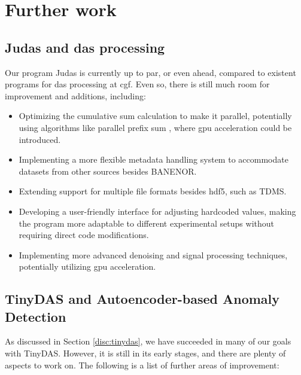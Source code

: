 \section{Further work}
\label{conc:further}

\subsection{Judas and \acrshort{das} processing}

Our program Judas is currently up to par, or even ahead, compared to existent programs for \acrshort{das} processing at \acrshort{cgf}. Even so, there is still much room for improvement and additions, including:

\begin{itemize}
    \item Optimizing the cumulative sum calculation to make it parallel, potentially using algorithms like parallel prefix sum \cite{harris2007parallel}, where \acrshort{gpu} acceleration could be introduced.
    \item Implementing a more flexible metadata handling system to accommodate datasets from other sources besides BANENOR.
    \item Extending support for multiple file formats besides \acrshort{hdf5}, such as TDMS.
    \item Developing a user-friendly interface for adjusting hardcoded values, making the program more adaptable to different experimental setups without requiring direct code modifications.
    \item Implementing more advanced denoising and signal processing techniques, potentially utilizing \acrshort{gpu} acceleration.
\end{itemize}

\subsection{TinyDAS and Autoencoder-based Anomaly Detection}

As discussed in Section \ref{disc:tinydas}, we have succeeded in many of our goals with TinyDAS. However, it is still in its early stages, and there are plenty of aspects to work on. The following is a list of further areas of improvement:

